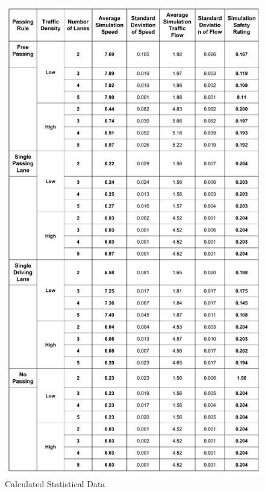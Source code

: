 \documentclass{amsart}
\begin{document}
	\begin{figure}[H]
	\begin{center}
	\includegraphics[scale=0.25]{MCMStatisticalAnalysisOfTrafficFlow}
	\caption{Calculated Statistical Data}
	\renewcommand{\figurename}{}
	\end{center}
	\end{figure}
	
\end{document}
